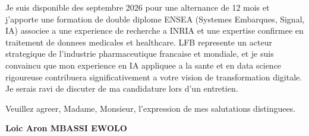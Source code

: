\documentclass[a4paper,11pt]{article}
\begin{document}
Je suis disponible des septembre 2026 pour une alternance de 12 mois et j'apporte une formation de double diplome ENSEA (Systemes Embarques, Signal, IA) associee a une experience de recherche a INRIA et une expertise confirmee en traitement de donnees medicales et healthcare. LFB represente un acteur strategique de l'industrie pharmaceutique francaise et mondiale, et je suis convaincu que mon experience en IA appliquee a la sante et en data science rigoureuse contribuera significativement a votre vision de transformation digitale. Je serais ravi de discuter de ma candidature lors d'un entretien.

\vspace{1.5em}
\noindent Veuillez agreer, Madame, Monsieur, l'expression de mes salutations distinguees.

\vspace{2em}
\noindent \textbf{Loic Aron MBASSI EWOLO}
\end{document}
